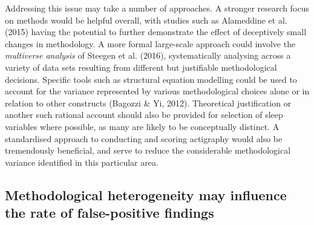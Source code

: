 \documentclass[
]{article}
\begin{document}
Addressing this issue may take a number of approaches. A stronger research focus on methods would be helpful overall, with studies such as Alameddine et al. (2015) having the potential to further demonstrate the effect of deceptively small changes in methodology. A more formal large-scale approach could involve the \emph{multiverse analysis} of Steegen et al. (2016), systematically analysing across a variety of data sets resulting from different but justifiable methodological decisions. Specific tools such as structural equation modelling could be used to account for the variance represented by various methodological choices alone or in relation to other constructs (Bagozzi \& Yi, 2012). Theoretical justification or another such rational account should also be provided for selection of sleep variables where possible, as many are likely to be conceptually distinct. A standardised approach to conducting and scoring actigraphy would also be tremendously beneficial, and serve to reduce the considerable methodological variance identified in this particular area.

\subsection{Methodological heterogeneity may influence the rate of false-positive findings}\label{methodological-heterogeneity-may-influence-the-rate-of-false-positive-findings}
\end{document}
